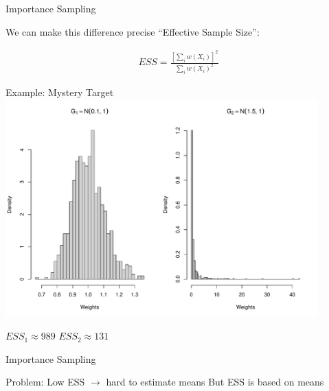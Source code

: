 \documentclass[14pt]{beamer}
\newcommand{\bE}{\mathbb{E}}
\begin{document}
\begin{frame}{Importance Sampling}
    \begin{outline}
        \1 We can make this difference precise
        \1 ``Effective Sample Size'':
    \end{outline}
    \begin{gather*}
        ESS = \frac{\left[\sum_i w(X_i)\right]^2}{\sum_i w(X_i)^2}
    \end{gather*}
\end{frame}

\begin{frame}{Example: Mystery Target}
    \centering
    \includegraphics[height=0.7\textheight, width=0.9\textwidth, keepaspectratio]{Figures/Wt Hist.pdf} \newline
    \begin{outline}
        $ESS_1 \approx 989$ \hspace{2.5cm} $ESS_2 \approx 131$
    \end{outline}
\end{frame}

\begin{frame}{Importance Sampling}
    \begin{outline}
        \1 Problem: Low ESS $\rightarrow$ hard to estimate means \newline
        \1 But ESS is based on means
            \2 \citep{Cha18}
    \end{outline}
\end{frame}

\end{document}
